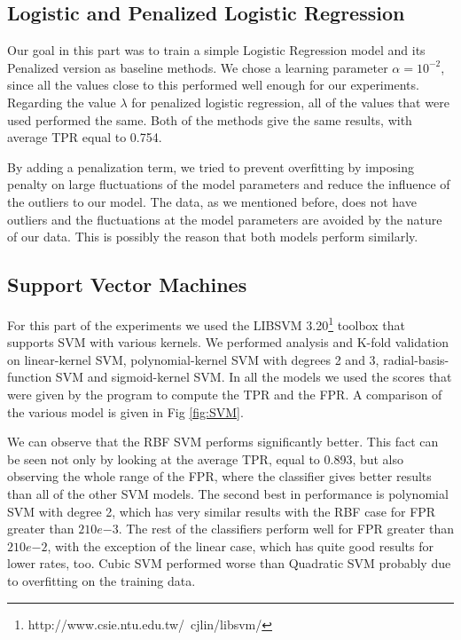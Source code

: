 \subsection{Logistic and Penalized Logistic Regression}
\noindent Our goal in this part was to train a simple Logistic Regression model and its Penalized version as baseline methods. We chose a learning parameter $\alpha = 10^{-2}$, since all the values close to this performed well enough for our experiments. Regarding the value  $\lambda$ for penalized logistic regression, all of the values that were used performed the same.  Both of the methods give the same results, with average TPR equal to 0.754.

\noindent By adding a penalization term, we tried to prevent overfitting by imposing penalty on large fluctuations of the model parameters and reduce the influence of the outliers to our model. The data, as we mentioned before, does not have outliers and the fluctuations at the model parameters are avoided by the nature of our data. This is possibly the reason that both models perform similarly. 

\subsection{Support Vector Machines}
\noindent For this part of the experiments we used the LIBSVM 3.20\footnote{http://www.csie.ntu.edu.tw/~cjlin/libsvm/} toolbox that supports SVM with various kernels.  We performed analysis and K-fold validation on linear-kernel SVM, polynomial-kernel SVM with degrees 2 and 3, radial-basis-function SVM and sigmoid-kernel SVM. In all the models we used the scores that were given by the program to compute the TPR and the FPR. A comparison of the various model is given in Fig \ref{fig:SVM}.

\noindent We can observe that the RBF SVM performs significantly better. This fact can be seen not only by looking at the average TPR, equal to 0.893, but also observing the whole range of the FPR, where the classifier gives better results than all of the other SVM models. The second best in performance is polynomial SVM with degree 2, which has very similar results with the RBF case for FPR greater than $2 10e{-3}$. The rest of the classifiers perform well for FPR greater than $2 10e{-2}$, with the exception of the linear case, which has quite good results for lower rates, too.  Cubic SVM performed worse than Quadratic SVM probably due to overfitting on the training data.

